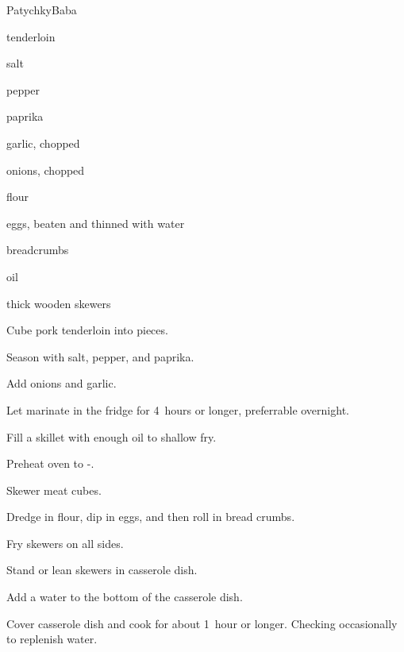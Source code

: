 \begin{recipe}{Patychky}{Baba}{}

\begin{ingredients}
\item {} tenderloin
\item salt
\item pepper
\item paprika
\item garlic, chopped
\item onions, chopped
\item flour
\item eggs, beaten and thinned with water
\item breadcrumbs
\item oil
\item thick wooden skewers
\end{ingredients}

\begin{directions}
\item Cube pork tenderloin into \inch{\half} pieces.
\item Season with salt, pepper, and paprika.
\item Add onions and garlic.
\item Let marinate in the fridge for 4~hours or longer, preferrable overnight.
\item Fill a skillet with enough oil to shallow fry.
\item Preheat oven to -.
\item Skewer meat cubes.
\item Dredge in flour, dip in eggs, and then roll in bread crumbs.
\item Fry skewers on all sides.
\item Stand or lean skewers in casserole dish.
\item Add a water to the bottom of the casserole dish.
\item Cover casserole dish and cook for about 1~hour or longer. Checking occasionally to replenish water.
\end{directions}

\end{recipe}
